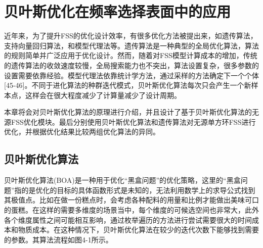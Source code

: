 \newpage

\section{贝叶斯优化在频率选择表面中的应用}

近年来，为了提升FSS的优化设计效率，有很多优化方法被提出来，如遗传算法，支持向量回归算法，和模型代理法等。遗传算法是一种典型的全局优化算法，算法的规则简单并广泛应用于优化设计。然而，随着对FSS模型计算成本的增加，传统的遗传算法的收敛速度较慢，全局搜索能力也不突出，算法设置复杂，很多参数的设置需要依靠经验。模型代理法依靠统计学方法，通过采样的方法确定下一个个体[45-46]。不同于进化算法的种群迭代模式，贝叶斯优化算法每次只会产生一个新样本点，这样会在很大程度减少了计算量减少了设计周期。

本章将会对贝叶斯优化算法的原理进行介绍，并且设计了基于贝叶斯优化算法的无源FSS优化模块。最后分别使用贝叶斯优化算法和遗传算法对无源单方环FSS进行优化，并根据优化结果比较两组优化算法的异同。

\subsection{贝叶斯优化算法}

贝叶斯优化算法(BOA)是一种用于优化“黑盒问题”的优化策略，这里的“黑盒问题”指的是优化的目标的具体函数形式是未知的，无法利用数学上的求导公式找到其极值点。比如在做一份糕点时，会考虑各种配料的用量和比例才能做出美味可口的蛋糕。在这样的需要多维度的场景当中，每个维度的可候选空间也非常大，此外各个维度属性之间可能相互影响，通过枚举遍历的方法进行尝试需要很大的时间成本和物质成本。在这种情况下，贝叶斯优化算法在较少的迭代次数下能够找到需要的参数。其算法流程如图4-1所示。